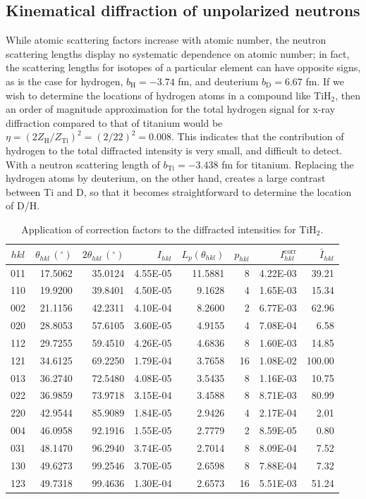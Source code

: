 \subsection{Kinematical diffraction of unpolarized neutrons}\label{\chabbr:sec:nunpolarized}
While atomic scattering factors increase with atomic number, the neutron scattering lengths display no systematic dependence on atomic number; in fact, the scattering lengths for isotopes of a particular element can have opposite signs, as is the case for hydrogen, $b_{\text{H}}=-3.74$ fm, and deuterium $b_{\text{D}}=6.67$ fm.  If we wish to determine the locations of hydrogen atoms in a compound like TiH$_2$, then an order of magnitude approximation for the total hydrogen signal for x-ray diffraction compared to that of titanium would be $\eta=(2Z_{\text{H}}/Z_{\text{Ti}})^2=(2/22)^2 = 0.008$. This indicates that the contribution of hydrogen to the total diffracted intensity is very small, and difficult to detect. With a neutron scattering length of $b_{\text{Ti}}=-3.438$ fm for titanium.  Replacing the hydrogen atoms by deuterium, on the other hand, creates a large contrast between Ti and D, so that it becomes straightforward to determine the location of D/H.  


\begin{table}[h!]
\centering\leavevmode
{\small\begin{tabular}{|crrrrrrr|}
\hline
$hkl$ & $\theta_{hkl}\,(^{\circ})$ & $2\theta_{hkl} \,(^{\circ})$ & $I_{hkl}$ & $L_p(\theta_{hkl})$ & $p_{hkl}$ & $I_{hkl}^{\text{corr}}$ & $\bar{I}_{hkl}$ \\
\hline\hline
011 & 17.5062 & 35.0124 & 4.55E-05 & 11.5881 & 8 & 4.22E-03 & 39.21 \\
110 & 19.9200 & 39.8401 & 4.50E-05 & 9.1628 & 4  & 1.65E-03 & 15.34 \\
002 & 21.1156 & 42.2311 & 4.10E-04 & 8.2600 & 2  & 6.77E-03 & 62.96 \\
020 & 28.8053 & 57.6105 & 3.60E-05 & 4.9155 & 4  & 7.08E-04 & 6.58 \\
112 & 29.7255 & 59.4510 & 4.26E-05 & 4.6836 & 8  & 1.60E-03 & 14.85 \\
121 & 34.6125 & 69.2250 & 1.79E-04 & 3.7658 & 16& 1.08E-02 & 100.00 \\
013 & 36.2740 & 72.5480 & 4.08E-05 & 3.5435 & 8 & 1.16E-03 & 10.75 \\
022 & 36.9859 & 73.9718 & 3.15E-04 & 3.4588 & 8 & 8.71E-03 & 80.99 \\
220 & 42.9544 & 85.9089 & 1.84E-05 & 2.9426 & 4 & 2.17E-04 & 2.01 \\
004 & 46.0958 & 92.1916 & 1.55E-05 & 2.7779 & 2 & 8.59E-05 & 0.80 \\
031 & 48.1470 & 96.2940 & 3.74E-05 & 2.7014 & 8 & 8.09E-04 & 7.52 \\
130 & 49.6273 & 99.2546 & 3.70E-05 & 2.6598 & 8 & 7.88E-04 & 7.32 \\
123 & 49.7318 & 99.4636 & 1.30E-04 & 2.6573 & 16 & 5.51E-03 & 51.24 \\
\hline
\end{tabular}}
\caption{\label{\chabbr:tb:CalcTiH2}Application of correction factors to the diffracted intensities for TiH$_2$.}
\end{table}


